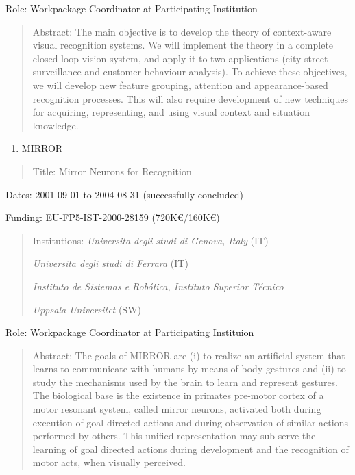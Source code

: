 \documentclass[
]{article}
\begin{document}
Role: Workpackage Coordinator at Participating Institution

\begin{quote}
Abstract: The main objective is to develop the theory of context-aware
visual recognition systems. We will implement the theory in a complete
closed-loop vision system, and apply it to two applications (city street
surveillance and customer behaviour analysis). To achieve these
objectives, we will develop new feature grouping, attention and
appearance-based recognition processes. This will also require
development of new techniques for acquiring, representing, and using
visual context and situation knowledge.
\end{quote}

\begin{enumerate}
\def\labelenumi{\arabic{enumi}.}
\setcounter{enumi}{17}
\item
  \ul{MIRROR}
\end{enumerate}

\begin{quote}
Title: Mirror Neurons for Recognition
\end{quote}

Dates: 2001-09-01 to 2004-08-31 (successfully concluded)

Funding: EU-FP5-IST-2000-28159 (720K€/160K€)

\begin{quote}
Institutions: \emph{Universita degli studi di Genova, Italy} (IT)

\emph{Universita degli studi di Ferrara} (IT)

\emph{Instituto de Sistemas e Robótica, Instituto Superior Técnico}

\emph{Uppsala Universitet} (SW)
\end{quote}

Role: Workpackage Coordinator at Participating Instituion

\begin{quote}
Abstract: The goals of MIRROR are (i) to realize an artificial system
that learns to communicate with humans by means of body gestures and
(ii) to study the mechanisms used by the brain to learn and represent
gestures. The biological base is the existence in primates pre-motor
cortex of a motor resonant system, called mirror neurons, activated both
during execution of goal directed actions and during observation of
similar actions performed by others. This unified representation may sub
serve the learning of goal directed actions during development and the
recognition of motor acts, when visually perceived.
\end{quote}
\end{document}
